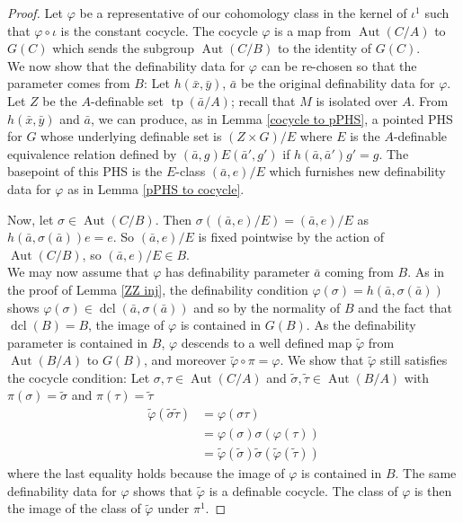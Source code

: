 \documentclass{article}
\theoremstyle{problemstyle}
\DeclareMathOperator{\tp}{tp} %
\DeclareMathOperator{\aut}{Aut} %
\DeclareMathOperator{\dcl}{dcl} %
\begin{document}
\begin{proof}
Let $\varphi$ be a representative of our cohomology class in the kernel of $\iota^1$ such that $\varphi \circ \iota$ is the constant cocycle. The cocycle $\varphi$ is a map from $\aut(C/A)$ to $G(C)$ which sends the subgroup $\aut(C/B)$ to the identity of $G(C)$.\\

We now show that the definability data for $\varphi$ can be re-chosen so that the parameter comes from $B$: Let $h(\bar{x},\bar{y})$, $\bar{a}$ be the original definability data for $\varphi$. Let $Z$ be the $A$-definable set $\tp(\bar{a}/A)$; recall that $M$ is isolated over $A$. From $h(\bar{x},\bar{y})$ and $\bar{a}$, we can produce, as in Lemma \ref{cocycle to pPHS}, a pointed PHS for $G$ whose underlying definable set is $(Z\times G)/E$ where $E$ is the $A$-definable equivalence relation defined by $(\bar{a},g)E(\bar{a}',g')$ if $h(\bar{a},\bar{a}')g' = g$. The basepoint of this PHS is the $E$-class $(\bar{a},e)/E$ which furnishes new definability data for $\varphi$ as in Lemma \ref{pPHS to cocycle}.

Now, let $\sigma \in \aut(C/B)$. Then $\sigma((\bar{a},e)/E) = (\bar{a},e)/E$ as $h(\bar{a},\sigma(\bar{a}))e = e$. So $(\bar{a},e)/E$ is fixed pointwise by the action of $\aut(C/B)$, so $(\bar{a},e)/E \in B$.\\

We may now assume that $\varphi$ has definability parameter $\bar{a}$ coming from $B$. As in the proof of Lemma \ref{ZZ inj}, the definability condition $\varphi(\sigma) = h(\bar{a},\sigma(\bar{a}))$ shows $\varphi(\sigma) \in \dcl(\bar{a},\sigma(\bar{a}))$ and so by the normality of $B$ and the fact that $\dcl(B) = B$, the image of $\varphi$ is contained in $G(B)$. As the definability parameter is contained in $B$, $\varphi$ descends to a well defined map $\tilde{\varphi}$ from $\aut(B/A)$ to $G(B)$, and moreover $\tilde{\varphi}\circ\pi = \varphi$. We show that $\tilde{\varphi}$ still satisfies the cocycle condition: Let $\sigma,\tau \in \aut(C/A)$ and $\tilde{\sigma},\tilde{\tau} \in \aut(B/A)$ with $\pi(\sigma) = \tilde{\sigma}$ and $\pi(\tau) = \tilde{\tau}$ 
\begin{align*}
    \tilde{\varphi}(\tilde{\sigma}\tilde{\tau}) &= \varphi(\sigma\tau)\\
    &= \varphi(\sigma)\sigma(\varphi(\tau))\\
    &= \tilde{\varphi}(\tilde{\sigma})\tilde{\sigma}(\tilde{\varphi}(\tilde{\tau}))
\end{align*}
where the last equality holds because the image of $\varphi$ is contained in $B$.  The same definability data for $\varphi$ shows that $\tilde{\varphi}$ is a definable cocycle. The class of $\varphi$ is then the image of the class of $\tilde{\varphi}$ under $\pi^1$.





 



\end{proof}
\end{document}
